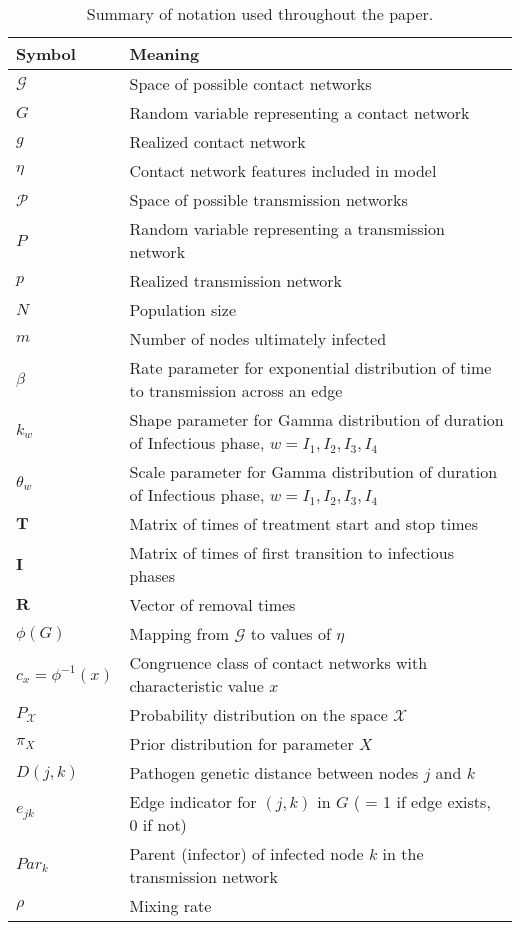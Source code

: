 \documentclass[11pt, notitlepage]{article}%
\numberwithin{equation}{section}
\begin{document}
\begin{table}
\centering
\doublespacing
\begin{tabular}{ll}
Symbol & Meaning \\ \hline
$\mathcal{G}$ & Space of possible contact networks \\
$G$ & Random variable representing a contact network \\
$g$ & Realized contact network \\
$\eta$ & Contact network features included in model \\
$\mathcal{P}$ & Space of possible transmission networks \\
$P$ & Random variable representing a transmission network \\
$p$ & Realized transmission network \\
$N$ & Population size \\
$m$ & Number of nodes ultimately infected \\
$\beta$ & Rate parameter for exponential distribution of time to transmission across an edge \\
$k_w$ & Shape parameter for Gamma distribution of duration of Infectious phase, $w=I_1, I_2, I_3, I_4$ \\
$\theta_w$ & Scale parameter for Gamma distribution of duration of Infectious phase, $w=I_1, I_2, I_3, I_4$ \\
$\mathbf{T}$ & Matrix of times of treatment start and stop times \\
$\mathbf{I}$ & Matrix of times of first transition to infectious phases \\
$\mathbf{R}$ & Vector of removal times \\
$\phi(G)$ & Mapping from $\mathcal{G}$ to values of $\eta$ \\
$c_x = \phi^{-1}(x)$ & Congruence class of contact networks with characteristic value $x$\\
$P_{\mathcal{X}}$ & Probability distribution on the space $\mathcal{X}$ \\
$\pi_X$ & Prior distribution for parameter $X$ \\
$D(j,k)$ & Pathogen genetic distance between nodes $j$ and $k$ \\
$e_{jk}$ & Edge indicator for $(j, k)$ in $G$ ( = 1 if edge exists, 0 if not) \\
$Par_k$ & Parent (infector) of infected node $k$ in the transmission network \\
$\rho$ & Mixing rate \\
\end{tabular}
\caption{Summary of notation used throughout the paper. }
\label{tab:notation}
\end{table}
\end{document}
